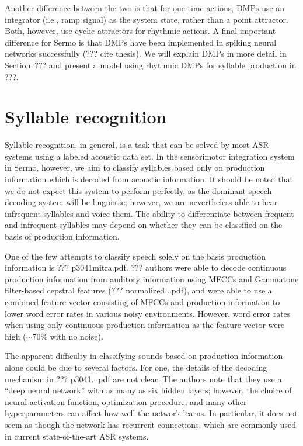Another difference between the two is that
for one-time actions,
DMPs use an integrator (i.e., ramp signal)
as the system state,
rather than a point attractor.
Both, however, use cyclic attractors
for rhythmic actions.
A final important difference for Sermo
is that DMPs have been implemented
in spiking neural networks successfully
(??? cite thesis).
We will explain DMPs in more detail
in Section~??? and present a model
using rhythmic DMPs for syllable production
in ???.

\section{Syllable recognition}

Syllable recognition, in general,
is a task that can be solved
by most ASR systems
using a labeled acoustic data set.
In the sensorimotor integration system
in Sermo, however,
we aim to classify syllables
based only on production information
which is decoded from acoustic information.
It should be noted that we do not expect
this system to perform perfectly,
as the dominant speech decoding system
will be linguistic;
however, we are nevertheless able
to hear infrequent syllables
and voice them.
The ability to differentiate
between frequent and infrequent syllables
may depend on whether they
can be classified
on the basis of production information.

One of the few attempts to classify speech
solely on the basis production information
is ??? p3041mitra.pdf.
??? authors were able to
decode continuous production information
from auditory information
using MFCCs and Gammatone filter-based
cepstral features (??? normalized...pdf),
and were able to use a combined feature vector
consisting of MFCCs and production information
to lower word error rates
in various noisy environments.
However, word error rates
when using only continuous production information
as the feature vector
were high ($\sim$70\% with no noise).

The apparent difficulty
in classifying sounds based on
production information alone
could be due to several factors.
For one, the details of the decoding mechanism
in ??? p3041...pdf are not clear.
The authors note that they use a
``deep neural network''
with as many as six hidden layers;
however, the choice of neural activation function,
optimization procedure,
and many other hyperparameters
can affect how well the network learns.
In particular, it does not seem as though
the network has recurrent connections,
which are commonly used in
current state-of-the-art ASR systems.

